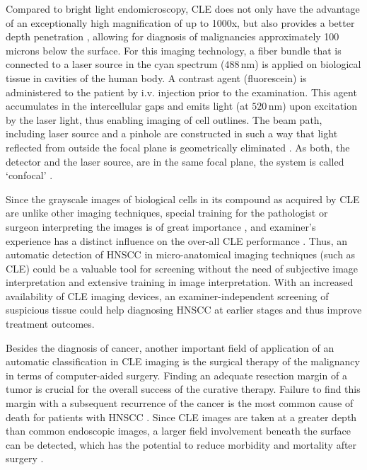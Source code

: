 \documentclass[fleqn,10pt]{wlscirep}
\begin{document}
Compared to bright light endomicroscopy, CLE does not only have the
advantage of an exceptionally high magnification of up to
1000x\cite{Oetter:2016cp}, but also provides a better depth
penetration \cite{Helmchen:2002vt}, allowing for diagnosis of
  malignancies approximately 100 microns below the surface.  For this imaging technology, a
fiber bundle that is connected to a laser source in the cyan spectrum ($488\,$nm) is
applied on biological tissue in cavities of the human body. A contrast agent (fluorescein) is administered
to the patient by i.v. injection prior to the examination. This agent accumulates in
the intercellular gaps and emits light (at $520\,$nm) upon excitation by the laser light, thus enabling
imaging of cell outlines. The beam path, including laser source and a pinhole are
constructed in such a way that light reflected from outside the focal
plane is geometrically eliminated \cite{SCA:SCA4950100403,Abbaci:2014wn}. As both, the detector and the laser source,
are in the same focal plane, the system is called `confocal' \cite{Hoffman:2006ei}.

Since the grayscale images of biological cells in its compound as acquired by CLE are unlike other imaging
techniques, special training for the pathologist or surgeon
interpreting the images is of great importance \cite{Abbaci:2014wn},
and examiner's experience has a distinct influence on the over-all CLE
performance \cite{Neumann:2011tc}. Thus, an automatic detection of
HNSCC in micro-anatomical imaging techniques (such as CLE) could be a valuable tool for screening without
the need of subjective image interpretation and extensive training in image interpretation. With an
increased availability of CLE imaging devices, an examiner-independent screening  of
suspicious tissue could help diagnosing HNSCC at earlier stages and
thus improve treatment outcomes.

Besides the diagnosis of cancer, another important field of application of an automatic classification in CLE imaging is the surgical therapy of the malignancy in terms of computer-aided surgery. Finding an adequate resection margin of a
tumor is crucial for the overall success of the curative
therapy. Failure to find this margin with a subsequent recurrence of the cancer is the most common cause of
death for patients with HNSCC \cite{Nathan:2014ky}. Since CLE images
are taken at a greater depth than common endoscopic images, a larger
field involvement beneath the surface can be detected, which has the
potential to reduce morbidity and mortality after surgery \cite{Nathan:2014ky}.
\end{document}
